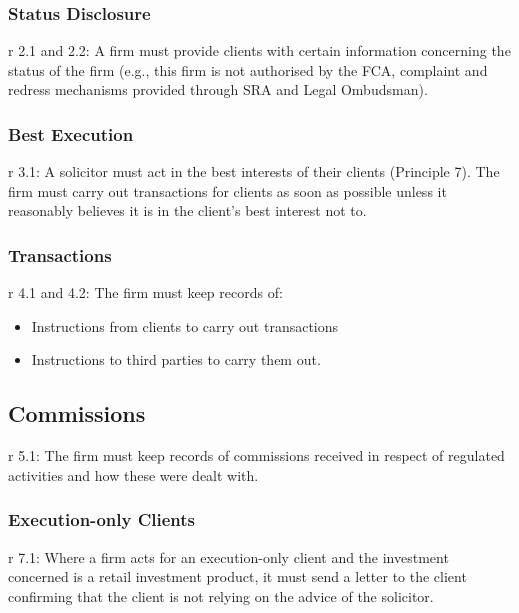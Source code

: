 \documentclass[
]{article}
\providecommand{\tightlist}{%
  \setlength{\itemsep}{0pt}\setlength{\parskip}{0pt}}
\begin{document}
\hypertarget{status-disclosure}{%
\subsubsection{Status Disclosure}\label{status-disclosure}}

r 2.1 and 2.2: A firm must provide clients with certain information
concerning the status of the firm (e.g., this firm is not authorised by
the FCA, complaint and redress mechanisms provided through SRA and Legal
Ombudsman).

\hypertarget{best-execution}{%
\subsubsection{Best Execution}\label{best-execution}}

r 3.1: A solicitor must act in the best interests of their clients
(Principle 7). The firm must carry out transactions for clients as soon
as possible unless it reasonably believes it is in the client's best
interest not to.

\hypertarget{transactions}{%
\subsubsection{Transactions}\label{transactions}}

r 4.1 and 4.2: The firm must keep records of:

\begin{itemize}
\tightlist
\item
  Instructions from clients to carry out transactions
\item
  Instructions to third parties to carry them out.
\end{itemize}

\hypertarget{commissions}{%
\subsection{Commissions}\label{commissions}}

r 5.1: The firm must keep records of commissions received in respect of
regulated activities and how these were dealt with.

\hypertarget{execution-only-clients}{%
\subsubsection{Execution-only Clients}\label{execution-only-clients}}

r 7.1: Where a firm acts for an execution-only client and the investment
concerned is a retail investment product, it must send a letter to the
client confirming that the client is not relying on the advice of the
solicitor.
\end{document}
